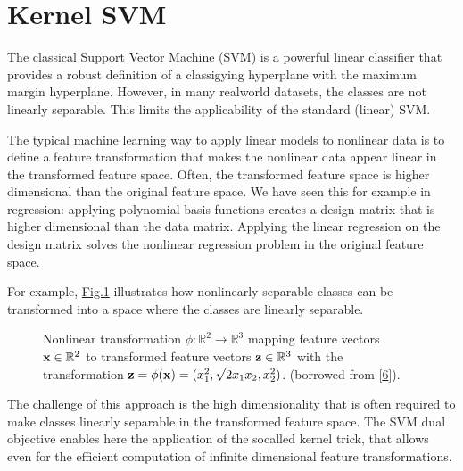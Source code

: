 \documentclass[letterpaper,10pt,english]{jupyterBook}
\let\sphinxpxdimen\pdfpxdimen\else\newdimen\sphinxpxdimen
\begin{document}
\sphinxstepscope


\section{Kernel SVM}
\label{\detokenize{classification_kernel_svm:kernel-svm}}\label{\detokenize{classification_kernel_svm::doc}}
\sphinxAtStartPar
The classical Support Vector Machine (SVM) is a powerful linear classifier that provides a robust definition of a classigying hyperplane with the maximum margin hyperplane. However, in many real\sphinxhyphen{}world datasets, the classes are not linearly separable. This limits the applicability of the standard (linear) SVM.

\sphinxAtStartPar
The typical machine learning way to apply linear models to nonlinear data is to define a feature transformation that makes the nonlinear data appear linear in the transformed feature space. Often, the transformed feature space is higher dimensional than the original feature space. We have seen this for example in regression: applying polynomial basis functions creates a design matrix that is higher dimensional than the data matrix. Applying the linear regression on the design matrix solves the nonlinear regression problem in the original feature space.

\sphinxAtStartPar
For example, \hyperref[\detokenize{classification_kernel_svm:non-linear-transformation-fig}]{Fig.\@ \ref{\detokenize{classification_kernel_svm:non-linear-transformation-fig}}} illustrates how non\sphinxhyphen{}linearly separable classes can be transformed into a space where the classes are linearly separable.


\begin{figure}
\centering
\noindent\sphinxincludegraphics[height=320\sphinxpxdimen]{{degree2_monomials}.png}
\caption{Non\sphinxhyphen{}linear transformation \(\phi: \mathbb{R}^2 \rightarrow \mathbb{R}^3 \) mapping feature vectors \( {\bf x}\in\mathbb{R}^2\) to transformed feature vectors \( {\bf z}\in\mathbb{R}^3\) with the transformation \( {\bf z} = \phi({\bf x}) = ( x_1^2 , \sqrt{2} x_1 x_2 , x_2^2 ) \).  (borrowed from {[}\hyperlink{cite.bibliography:id10}{6}{]}).}\label{\detokenize{classification_kernel_svm:non-linear-transformation-fig}}\end{figure}

\sphinxAtStartPar
The challenge of this approach is the high dimensionality that is often required to make classes linearly separable in the transformed feature space. The SVM dual objective enables here the application of the so\sphinxhyphen{}called kernel trick, that allows even for the efficient computation of infinite dimensional feature transformations.
\end{document}
